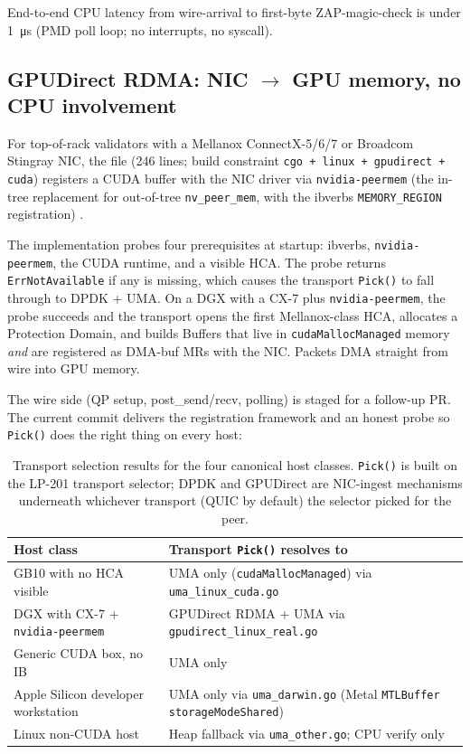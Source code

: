 End-to-end CPU latency from wire-arrival to first-byte
ZAP-magic-check is under \SI{1}{\micro\second} (PMD poll loop;
no interrupts, no syscall).

\subsection{GPUDirect RDMA: NIC $\to$ GPU memory, no CPU
involvement}

For top-of-rack validators with a Mellanox ConnectX-5/6/7 or
Broadcom Stingray NIC, the file
 (\num{246} lines;
build constraint \texttt{cgo + linux + gpudirect + cuda})
registers a CUDA buffer with the NIC driver via
\texttt{nvidia-peermem} (the in-tree replacement for
out-of-tree \texttt{nv\_peer\_mem}, with the ibverbs
\texttt{MEMORY\_REGION} registration) \cite{nvpeermem,gpudirect}.

The implementation probes four prerequisites at startup:
ibverbs, \texttt{nvidia-peermem}, the CUDA runtime, and a
visible HCA. The probe returns \texttt{ErrNotAvailable} if any
is missing, which causes the transport \texttt{Pick()} to fall
through to DPDK + UMA. On a DGX with a CX-7 plus
\texttt{nvidia-peermem}, the probe succeeds and the transport
opens the first Mellanox-class HCA, allocates a Protection
Domain, and builds Buffers that live in \texttt{cudaMallocManaged}
memory \emph{and} are registered as DMA-buf MRs with the NIC.
Packets DMA straight from wire into GPU memory.

The wire side (QP setup, post\_send/recv, polling) is staged for
a follow-up PR. The current commit delivers the registration
framework and an honest probe so \texttt{Pick()} does the right
thing on every host:

\begin{table}[h]
\centering
\small
\begin{tabular}{@{}lp{8cm}@{}}
\toprule
\textbf{Host class} & \textbf{Transport \texttt{Pick()} resolves to} \\
\midrule
GB10 with no HCA visible & UMA only (\texttt{cudaMallocManaged})
  via \texttt{uma\_linux\_cuda.go} \\
DGX with CX-7 +
  \texttt{nvidia-peermem} & GPUDirect RDMA + UMA via
  \texttt{gpudirect\_linux\_real.go} \\
Generic CUDA box, no IB & UMA only \\
Apple Silicon developer
  workstation & UMA only via \texttt{uma\_darwin.go} (Metal
  \texttt{MTLBuffer} \texttt{storageModeShared}) \\
Linux non-CUDA host & Heap fallback via \texttt{uma\_other.go};
  CPU verify only \\
\bottomrule
\end{tabular}
\caption{Transport selection results for the four canonical
host classes. \texttt{Pick()} is built on the LP-201 transport
selector; DPDK and GPUDirect are NIC-ingest mechanisms
underneath whichever transport (QUIC by default) the selector
picked for the peer.}
\label{tab:transport-pick}
\end{table}

